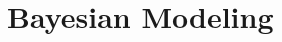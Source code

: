 \documentclass[11pt,a4paper,openany]{book}
\begin{document}
\frontmatter\tableofcontents
\mainmatter
\chapter{Bayesian Modeling}
\end{document}

